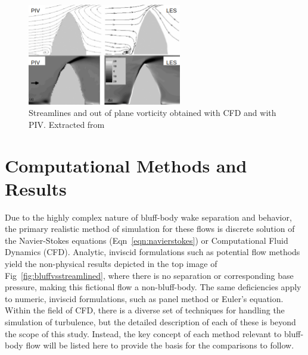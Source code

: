 \documentclass[journal]{new-aiaa}
\begin{document}
\begin{figure}[H]
\begin{center}
\includegraphics[width=0.6\textwidth]{Images/federico/Figure17}
\caption{Streamlines and out of plane vorticity obtained with CFD and with PIV. Extracted from \cite{Constantinescu2013}}
\label{fig:ExpResults7}
\end{center}
\end{figure}




















\clearpage

\section{Computational Methods and Results} \label{sec:computationalmethods}

Due to the highly complex nature of bluff-body wake separation and behavior, the primary realistic method of simulation for these flows is discrete solution of the Navier-Stokes equations (Eqn~\ref{eqn:navierstokes}) or Computational Fluid Dynamics (CFD). Analytic, inviscid formulations such as potential flow methods yield the non-physical results depicted in the top image of Fig~\ref{fig:bluffvsstreamlined}, where there is no separation or corresponding base pressure, making this fictional flow a non-bluff-body. The same deficiencies apply to numeric, inviscid formulations, such as panel method or Euler's equation. Within the field of CFD, there is a diverse set of techniques for handling the simulation of turbulence, but the detailed description of each of these is beyond the scope of this study. Instead, the key concept of each method relevant to bluff-body flow will be listed here to provide the basis for the comparisons to follow.
\end{document}
